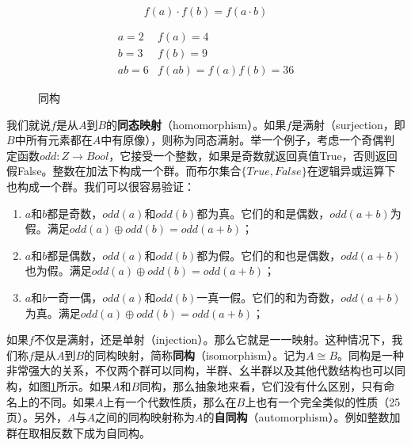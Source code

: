 \documentclass{article}
\begin{document}
\[
f(a) \cdot f(b) = f(a \cdot b)
\]

\begin{figure}[htbp]
\centering
{}
\[
\begin{array}{rl}
a = 2 & f(a) = 4 \\
b = 3 & f(b) = 9 \\
ab = 6 & f(ab) = f(a)f(b) = 36
\end{array}
\]
\caption{同构}
\label{fig:isomorphism}
\end{figure}

我们就说$f$是从$A$到$B$的\textbf{同态映射}（homomorphism）。如果$f$是满射（surjection，即$B$中所有元素都在$A$中有原像），则称为同态满射。举一个例子，考虑一个奇偶判定函数$odd: Z \to Bool$，它接受一个整数，如果是奇数就返回真值True，否则返回假False。整数在加法下构成一个群。而布尔集合$\{True, False\}$在逻辑异或运算下也构成一个群。我们可以很容易验证：

\begin{enumerate}
\item $a$和$b$都是奇数，$odd(a)$和$odd(b)$都为真。它们的和是偶数，$odd(a+b)$为假。满足$odd(a) \oplus odd(b) = odd(a+b)$；
\item $a$和$b$都是偶数，$odd(a)$和$odd(b)$都为假。它们的和也是偶数，$odd(a+b)$也为假。满足$odd(a) \oplus odd(b) = odd(a+b)$；
\item $a$和$b$一奇一偶，$odd(a)$和$odd(b)$一真一假。它们的和为奇数，$odd(a+b)$为真。满足$odd(a) \oplus odd(b) = odd(a+b)$；
\end{enumerate}

如果$f$不仅是满射，还是单射（injection）。那么它就是一一映射。这种情况下，我们称$f$是从$A$到$B$的同构映射，简称\textbf{同构}（isomorphism）。记为$A \cong B$。同构是一种非常强大的关系，不仅两个群可以同构，半群、幺半群以及其他代数结构也可以同构，如图\ref{fig:isomorphism}所示。如果$A$和$B$同构，那么抽象地来看，它们没有什么区别，只有命名上的不同。如果$A$上有一个代数性质，那么在$B$上也有一个完全类似的性质\cite{ZhangHeRui1978}（25页）。另外，$A$与$A$之间的同构映射称为$A$的\textbf{自同构}（automorphism）。例如整数加群在取相反数下成为自同构。
\end{document}
